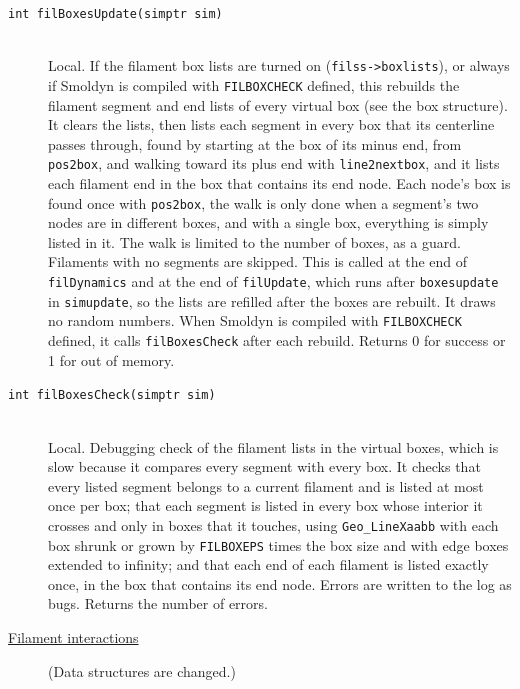 \documentclass {scrbook}
\newcommand {\ttt} {\texttt}
\begin{document}
\begin{description}
\item[\ttt{int filBoxesUpdate(simptr sim)}] %
\hfill \\
Local. If the filament box lists are turned on (\ttt{filss->boxlists}), or always if Smoldyn is compiled with \ttt{FILBOXCHECK} defined, this rebuilds the filament segment and end lists of every virtual box (see the box structure). It clears the lists, then lists each segment in every box that its centerline passes through, found by starting at the box of its minus end, from \ttt{pos2box}, and walking toward its plus end with \ttt{line2nextbox}, and it lists each filament end in the box that contains its end node. Each node's box is found once with \ttt{pos2box}, the walk is only done when a segment's two nodes are in different boxes, and with a single box, everything is simply listed in it. The walk is limited to the number of boxes, as a guard. Filaments with no segments are skipped. This is called at the end of \ttt{filDynamics} and at the end of \ttt{filUpdate}, which runs after \ttt{boxesupdate} in \ttt{simupdate}, so the lists are refilled after the boxes are rebuilt. It draws no random numbers. When Smoldyn is compiled with \ttt{FILBOXCHECK} defined, it calls \ttt{filBoxesCheck} after each rebuild. Returns 0 for success or 1 for out of memory.

\item[\ttt{int filBoxesCheck(simptr sim)}] %
\hfill \\
Local. Debugging check of the filament lists in the virtual boxes, which is slow because it compares every segment with every box. It checks that every listed segment belongs to a current filament and is listed at most once per box; that each segment is listed in every box whose interior it crosses and only in boxes that it touches, using \ttt{Geo\_LineXaabb} with each box shrunk or grown by \ttt{FILBOXEPS} times the box size and with edge boxes extended to infinity; and that each end of each filament is listed exactly once, in the box that contains its end node. Errors are written to the log as bugs. Returns the number of errors.

\item[\underline{Filament interactions}]
(Data structures are changed.)


\end{description}
\end{document}

